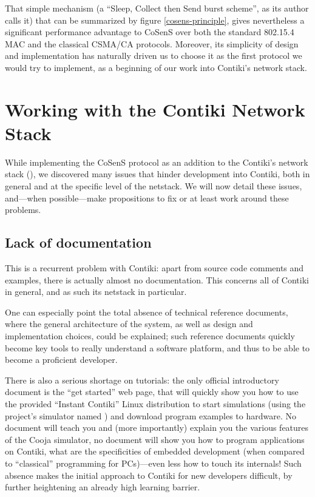 \documentclass[12pt,twoside,a4paper]{article}
\begin{document}
That simple mechanism (a ``Sleep, Collect then Send burst scheme'', as its
author calls it) that can be summarized by figure \ref{cosens-principle},
gives nevertheless a significant performance advantage to CoSenS over
both the standard 802.15.4 MAC and the classical CSMA/CA protocols.
Moreover, its simplicity of design and implementation has naturally
driven us to choose it as the first protocol we would try to implement,
as a beginning of our work into Contiki's network stack.


\section{Working with the Contiki Network Stack}

While implementing the CoSenS protocol as an addition to the Contiki's
network stack (), we discovered many issues that
hinder development into Contiki, both in general and at the specific level
of the netstack. We will now detail these issues, and---when possible---make
propositions to fix or at least work around these problems.


\subsection{Lack of documentation}

This is a recurrent problem with Contiki: apart from source code comments
and examples, there is actually almost no documentation. This concerns
all of Contiki in general, and as such its netstack in particular.

One can especially point the total absence of technical reference documents,
where the general architecture of the system, as well as design and
implementation choices, could be explained; such reference documents
quickly become key tools to really understand a software platform,
and thus to be able to become a proficient developer.

There is also a serious shortage on tutorials: the only official introductory
document is the ``get started'' web page, that will quickly show you how to
use the provided ``Instant Contiki'' Linux distribution to start simulations
(using the project's simulator named  \cite{cooja}) and download
program examples to hardware. No document will teach you and (more
importantly) explain you the various features of the Cooja simulator,
no document will show you how to program applications on Contiki, what are
the specificities of embedded development (when compared to ``classical''
programming for PCs)---even less how to touch its internals!
Such absence makes the initial approach to Contiki for new developers
difficult, by further heightening an already high learning barrier.
\end{document}
